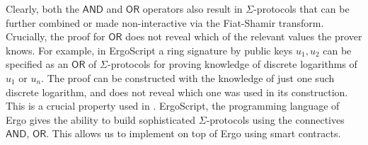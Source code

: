 \documentclass[runningheads]{llncs}
\newcommand{\langname}{ErgoScript\xspace}
\newcommand{\andnode}{\ensuremath{\mathsf{AND}}}
\newcommand{\ornode}{\ensuremath{\mathsf{OR}}}
\begin{document}
Clearly, both the $\andnode$ and $\ornode$ operators also result in $\Sigma$-protocols that can be further combined or made non-interactive via the Fiat-Shamir transform. Crucially, the proof for $\ornode$ does not reveal which of the relevant values the prover knows. For example, in \langname a ring signature by public keys $u_1, u_2$ can be specified as an $\ornode$ of $\Sigma$-protocols for proving knowledge of discrete logarithms of $u_1$ or $u_n$. The proof can be constructed with the knowledge of just one such discrete logarithm, and does not reveal which one was used in its construction. This is a crucial property used in \algname.
\langname, the programming language of Ergo gives the ability to build sophisticated $\Sigma$-protocols using the connectives $\andnode$, $\ornode$. This allows us to implement \algname on top of Ergo using smart contracts. 
\end{document}
